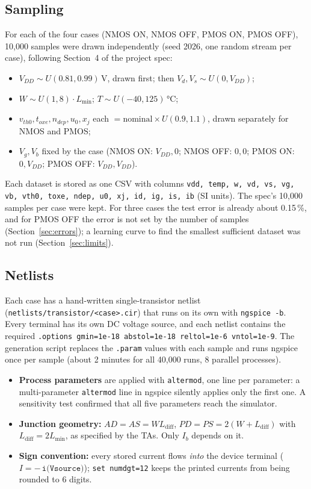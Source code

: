\documentclass[11pt,a4paper]{article}
\begin{document}
\subsection{Sampling}
For each of the four cases (NMOS ON, NMOS OFF, PMOS ON, PMOS OFF), 10,000 samples were drawn
independently (seed 2026, one random stream per case), following Section~4 of the project spec:
\begin{itemize}
  \item $V_{DD} \sim U(0.81, 0.99)$\,V, drawn first; then $V_d, V_s \sim U(0, V_{DD})$;
  \item $W \sim U(1, 8)\cdot L_{\min}$; $T \sim U(-40, 125)$\,\si{\celsius};
  \item $v_{th0}, t_{oxe}, n_{dep}, u_0, x_j$ each $= \text{nominal}\times U(0.9, 1.1)$, drawn separately for NMOS and PMOS;
  \item $V_g, V_b$ fixed by the case (NMOS ON: $V_{DD}, 0$; NMOS OFF: $0, 0$; PMOS ON: $0, V_{DD}$; PMOS OFF: $V_{DD}, V_{DD}$).
\end{itemize}
Each dataset is stored as one CSV with columns
\texttt{vdd, temp, w, vd, vs, vg, vb, vth0, toxe, ndep, u0, xj, id, ig, is, ib} (SI units).
The spec's 10,000 samples per case were kept. For three cases the test error is already about
0.15\,\%, and for PMOS OFF the error is not set by the number of samples (Section~\ref{sec:errors});
a learning curve to find the smallest sufficient dataset was not run (Section~\ref{sec:limits}).

\subsection{Netlists}
Each case has a hand-written single-transistor netlist (\texttt{netlists/transistor/<case>.cir})
that runs on its own with \texttt{ngspice -b}. Every terminal has its own DC voltage source, and
each netlist contains the required
\texttt{.options gmin=1e-18 abstol=1e-18 reltol=1e-6 vntol=1e-9}.
The generation script replaces the \texttt{.param} values with each sample and runs ngspice
once per sample (about 2 minutes for all 40,000 runs, 8 parallel processes).
\begin{itemize}
  \item \textbf{Process parameters} are applied with \texttt{altermod}, one line per parameter:
        a multi-parameter \texttt{altermod} line in ngspice silently applies only the first one.
        A sensitivity test confirmed that all five parameters reach the simulator.
  \item \textbf{Junction geometry:} $AD = AS = W L_{\mathrm{diff}}$, $PD = PS = 2(W + L_{\mathrm{diff}})$ with
        $L_{\mathrm{diff}} = 2L_{\min}$, as specified by the TAs. Only $I_b$ depends on it.
  \item \textbf{Sign convention:} every stored current flows \emph{into} the device terminal
        ($I = -\,\texttt{i(Vsource)}$); \texttt{set numdgt=12} keeps the printed currents from being
        rounded to 6 digits.
\end{itemize}
\end{document}

